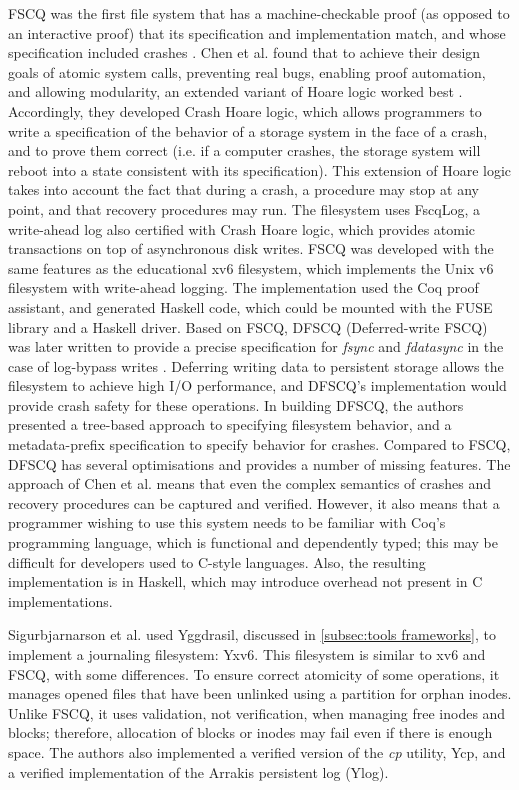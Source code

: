 FSCQ was the first file system that has a machine-checkable proof (as opposed to an interactive proof) that its specification and implementation match, and whose specification included crashes \cite{chen2015specifying}.
Chen et al. found that to achieve their design goals of atomic system calls, preventing real bugs, enabling proof automation, and allowing modularity, an extended variant of Hoare logic worked best \cite{chen2015using}.
Accordingly, they developed Crash Hoare logic, which allows programmers to write a specification of the behavior of a storage system in the face of a crash, and to prove them correct (i.e. if a computer crashes, the storage system will reboot into a state consistent with its specification).
This extension of Hoare logic takes into account the fact that during a crash, a procedure may stop at any point, and that recovery procedures may run.
The filesystem uses FscqLog, a write-ahead log also certified with Crash Hoare logic, which provides atomic transactions on top of asynchronous disk writes.
FSCQ was developed with the same features as the educational xv6 filesystem, which implements the Unix v6 filesystem with write-ahead logging.
The implementation used the Coq proof assistant, and generated Haskell code, which could be mounted with the FUSE library and a Haskell driver.
Based on FSCQ, DFSCQ (Deferred-write FSCQ) was later written to provide a precise specification for \textit{fsync} and \textit{fdatasync} in the case of log-bypass writes \cite{chen2017}.
Deferring writing data to persistent storage allows the filesystem to achieve high I/O performance, and DFSCQ's implementation would provide crash safety for these operations.
In building DFSCQ, the authors presented a tree-based approach to specifying filesystem behavior, and a metadata-prefix specification to specify behavior for crashes.
Compared to FSCQ, DFSCQ has several optimisations and provides a number of missing features.
The approach of Chen et al. means that even the complex semantics of crashes and recovery procedures can be captured and verified.
However, it also means that a programmer wishing to use this system needs to be familiar with Coq's programming language, which is functional and dependently typed; this may be difficult for developers used to C-style languages.
Also, the resulting implementation is in Haskell, which may introduce overhead not present in C implementations.

Sigurbjarnarson et al. used Yggdrasil, discussed in \autoref{subsec:tools frameworks}, to implement a journaling filesystem: Yxv6.
This filesystem is similar to xv6 and FSCQ, with some differences.
To ensure correct atomicity of some operations, it manages opened files that have been unlinked using a partition for orphan inodes.
Unlike FSCQ, it uses validation, not verification, when managing free inodes and blocks; therefore, allocation of blocks or inodes may fail even if there is enough space.
The authors also implemented a verified version of the \textit{cp} utility, Ycp, and a verified implementation of the Arrakis \cite{peter2014} persistent log (Ylog).
